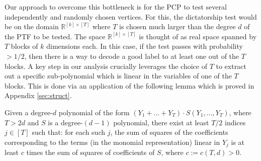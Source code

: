 Our approach to overcome this bottleneck is for the PCP to test
several independently and randomly chosen vertices. For this, the
dictatorship test would be on the domain
$\mathbb{R}^{[k]\times[T]}$ where
$T$ is chosen much larger than the degree $d$ of the PTF to be tested.
The space $\mathbb{R}^{[k]\times[T]}$ is thought of as real space
spanned by $T$ blocks of $k$ dimensions each. 
In this case, if the test passes with probability $ > 1/2$, then there
is a way to decode a good label to at least one out of the $T$
blocks. 
A key step in our analysis crucially leverages the choice of $T$ to extract
out a specific sub-polynomial which is linear in the variables of one of the
$T$ blocks. This
is done via an application of the following lemma which is
proved in Appendix \ref{sec:struct}.
\begin{lemma}\label{lem-approx-structural-intro}
Given a degree-$d$ polynomial of the form $(Y_1 + \dots +
Y_T) \cdot S(Y_1,\dots, Y_T)$, where $T  > 2d$ and $S$ is a degree-$(d-1)$ polynomial, there exist at least $T/2$ indices $j \in [T]$
such that: for each such $j$, the sum of squares of the coefficients corresponding to the
terms (in the monomial representation) linear in $Y_j$ is
at least $c$ times the sum of squares of coefficients of $S$,
where $c := c(T,d) > 0$.  
\end{lemma}

